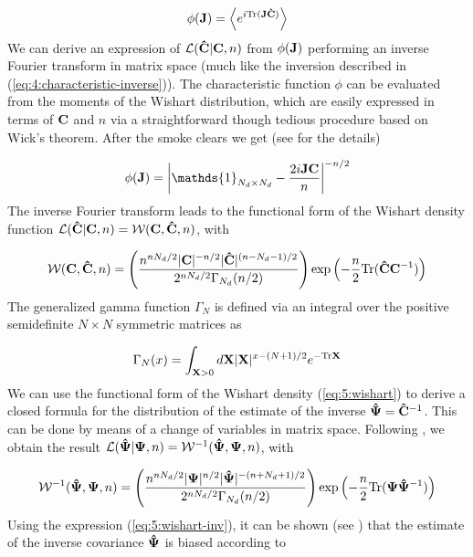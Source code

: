 \begin{equation}
\label{eq:5:chardef}
\phi(\mathbf{J}) = \left\langle e^{i{\rm Tr}(\mathbf{J}\mathbf{\hat{C}})}\right\rangle
\end{equation}
%
We can derive an expression of $\mathcal{L}(\mathbf{\hat{C}}\vert\mathbf{C},n)$ from $\phi(\mathbf{J})$ performing an inverse Fourier transform in matrix space (much like the inversion described in (\ref{eq:4:characteristic-inverse})). The characteristic function $\phi$ can be evaluated from the moments of the Wishart distribution, which are easily expressed in terms of $\mathbf{C}$ and $n$ via a straightforward though tedious procedure based on Wick's theorem. After the smoke clears we get (see \citep{Taylor12} for the details)

\begin{equation}
\label{eq:5:charw}
\phi(\bb{J}) = \left\vert\mathds{1}_{N_d\times N_d}-\frac{2i\bb{JC}}{n}\right\vert^{-n/2}
\end{equation}
%
The inverse Fourier transform leads to the functional form of the Wishart density function $\mathcal{L}(\mathbf{\hat{C}}\vert\mathbf{C},n) = \mathcal{W}(\mathbf{C},\mathbf{\hat{C}},n)$, with

\begin{equation}
\label{eq:5:wishart}
\mathcal{W}(\mathbf{C},\mathbf{\hat{C}},n) =  \left(\frac{n^{nN_d/2}\vert \mathbf{C}\vert^{-n/2}\vert\mathbf{\hat{C}}\vert^{(n-N_d-1)/2}}{2^{nN_d/2}\Gamma_{N_d}(n/2)}\right)\exp\left(-\frac{n}{2}{\rm Tr}(\mathbf{\hat{C}}\mathbf{C}^{-1})\right)
\end{equation}
%
The generalized gamma function $\Gamma_N$ is defined via an integral over the positive semidefinite $N\times N$ symmetric matrices as 

\begin{equation}
\label{eq:5:gengamma}
\Gamma_N(x) = \int_{\mathbf{X}>0}d\mathbf{X}\vert\mathbf{X}\vert^{x-(N+1)/2}e^{-{\rm Tr}\mathbf{X}}
\end{equation}
%
We can use the functional form of the Wishart density (\ref{eq:5:wishart}) to derive a closed formula for the distribution of the estimate of the inverse $\mathbf{\hat{\Psi}}=\mathbf{\hat{C}}^{-1}$. This can be done by means of a change of variables in matrix space. Following \citep{Taylor12}, we obtain the result $\mathcal{L}(\mathbf{\hat{\Psi}}\vert\mathbf{\Psi},n) = \mathcal{W}^{-1}(\mathbf{\hat{\Psi}},\mathbf{\Psi},n)$, with 

\begin{equation}
\label{eq:5:wishart-inv}
\mathcal{W}^{-1}(\mathbf{\hat{\Psi}},\mathbf{\Psi},n) = \left(\frac{n^{nN_d/2}\vert \mathbf{\Psi}\vert^{n/2}\vert\mathbf{\hat{\Psi}}\vert^{-(n+N_d+1)/2}}{2^{nN_d/2}\Gamma_{N_d}(n/2)}\right)\exp\left(-\frac{n}{2}{\rm Tr}(\mathbf{\Psi}\mathbf{\hat{\Psi}}^{-1})\right)
\end{equation}
%
Using the expression (\ref{eq:5:wishart-inv}), it can be shown (see \citep{MasumotoWishart}) that the estimate of the inverse covariance $\mathbf{\hat{\Psi}}$ is biased according to

